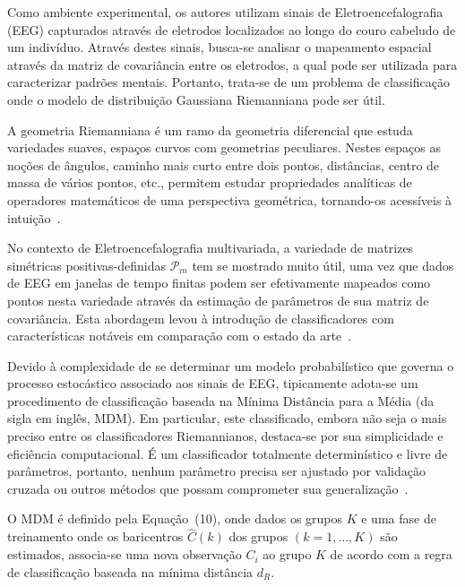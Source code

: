 \documentclass[a4paper,titlepage]{article}
\begin{document}
Como ambiente experimental, os autores utilizam sinais de Eletroencefalografia
(EEG) capturados através de eletrodos localizados ao longo do couro cabeludo de
um indivíduo. Através destes sinais, busca-se analisar o mapeamento espacial
através da matriz de covariância entre os eletrodos, a qual pode ser utilizada
para caracterizar padrões mentais. Portanto, trata-se de um problema de
classificação onde o modelo de distribuição Gaussiana Riemanniana pode ser
útil.

A geometria Riemanniana é um ramo da geometria diferencial que estuda
variedades suaves, espaços curvos com geometrias peculiares. Nestes espaços as
noções de ângulos, caminho mais curto entre dois pontos, distâncias, centro de
massa de vários pontos, etc., permitem estudar propriedades analíticas de
operadores matemáticos de uma perspectiva geométrica, tornando-os acessíveis à
intuição~\cite{levi1925lezioni,congedo2019riemannian}.

No contexto de Eletroencefalografia multivariada, a variedade de matrizes
simétricas positivas-definidas $\mathcal{P}_m$ tem se mostrado muito útil, uma
vez que dados de EEG em janelas de tempo finitas podem ser efetivamente
mapeados como pontos nesta variedade através da estimação de parâmetros de sua
matriz de covariância. Esta abordagem levou à introdução de classificadores com
características notáveis em comparação com o estado da
arte~\cite{congedo2019riemannian}.

Devido à complexidade de se determinar um modelo probabilístico que governa
o processo estocástico associado aos sinais de EEG, tipicamente adota-se um
procedimento de classificação baseada na Mínima Distância para a Média (da
sigla em inglês, MDM). Em particular, este classificado, embora não seja o mais
preciso entre os classificadores Riemannianos, destaca-se por sua simplicidade
e eficiência computacional. É um classificador totalmente determinístico e
livre de parâmetros, portanto, nenhum parâmetro precisa ser ajustado por
validação cruzada ou outros métodos que possam comprometer sua
generalização~\cite{congedo2019riemannian}.

O MDM é definido pela Equação~(10), onde dados os grupos $K$ e uma fase de
treinamento onde os baricentros $\hat{C}(k)$ dos grupos $(k=1,\ldots,K)$ são
estimados, associa-se uma nova observação $C_i$ ao grupo $\hat{K}$ de acordo
com a regra de classificação baseada na mínima distância $d_R$.
\end{document}

